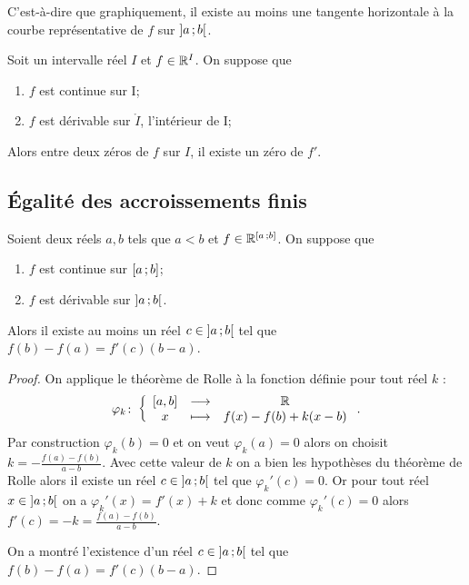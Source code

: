 C'est-à-dire que graphiquement, il existe au moins une tangente horizontale à la courbe représentative de \(f\) sur \(\left] a \, ;  b \right[\).

\begin{corth}
  Soit un intervalle réel \(I\) et \(f \in \mathbb{R}^I\). On suppose que
  \begin{enumerate}
  \item \(f\) est continue sur I;
  \item \(f\) est dérivable sur \(\mathring{I}\), l'intérieur de I;
  \end{enumerate}
  Alors entre deux zéros de \(f\) sur \(I\), il existe un zéro de \(f'\).
\end{corth}

\subsection{Égalité des accroissements finis}

\begin{theo}
  Soient deux réels \(a,b\) tels que \(a < b\) et \(f \in \mathbb{R}^{\left[ a \, ;  b \right]}\). On suppose que
  \begin{enumerate}
  \item \(f\) est continue sur \(\left[ a \, ;  b \right]\);
  \item \(f\) est dérivable sur \(\left] a \, ;  b \right[\).
  \end{enumerate}
  Alors il existe au moins un réel \(c \in \left] a \, ;  b \right[\) tel que \(f(b)-f(a)=f'(c)(b-a)\). 
\end{theo}
\begin{proof}
  On applique le théorème de Rolle à la fonction définie pour tout réel \(k\) :
  \begin{equation}
    \varphi_k\colon \left\{\begin{array}{ccc} [a,b] & \longrightarrow &\mathbb{R}\\ x & \longmapsto & f(x)-f(b)+k(x-b) \end{array} \right..
  \end{equation}
  Par construction \(\varphi_k(b)=0\) et on veut \(\varphi_k(a)=0\) alors on choisit \(k = -\frac{f(a)-f(b)}{a-b}\). Avec cette valeur de \(k\) on a bien les hypothèses du théorème de Rolle alors il existe un réel \(c \in \left] a \, ;  b \right[\) tel que \(\varphi_k'(c)=0\). Or pour tout réel \(x \in \left] a \, ;  b \right[\) on a \(\varphi_k'(x)=f'(x)+k\) et donc comme \(\varphi_k'(c)=0\) alors \(f'(c)=-k=\frac{f(a)-f(b)}{a-b}\).

On a montré l'existence d'un réel \(c \in \left] a \, ;  b \right[\) tel que \(f(b)-f(a)=f'(c)(b-a)\).
\end{proof}

